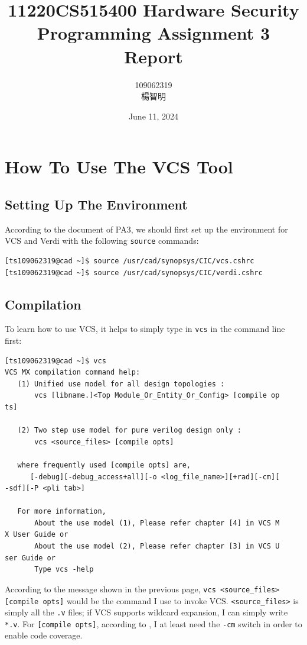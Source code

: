 \documentclass{article}
\title{11220CS515400 Hardware Security\\Programming Assignment 3 Report}
\author{109062319 \begin{CJK*}{UTF8}{bkai}楊智明\end{CJK*}}
\date{June 11, 2024}
\begin{document}
\maketitle

\section{How To Use The VCS Tool}

\subsection{Setting Up The Environment}

According to the document of PA3, we should first set up the environment for VCS and Verdi with the following \verb|source| commands:

\begin{verbatim}
[ts109062319@cad ~]$ source /usr/cad/synopsys/CIC/vcs.cshrc
[ts109062319@cad ~]$ source /usr/cad/synopsys/CIC/verdi.cshrc
\end{verbatim}

\subsection{Compilation}

To learn how to use VCS, it helps to simply type in \verb|vcs| in the command line first:

\begin{verbatim}
[ts109062319@cad ~]$ vcs
VCS MX compilation command help:
   (1) Unified use model for all design topologies :
       vcs [libname.]<Top Module_Or_Entity_Or_Config> [compile op
ts]

   (2) Two step use model for pure verilog design only :
       vcs <source_files> [compile opts]

   where frequently used [compile opts] are,
      [-debug][-debug_access+all][-o <log_file_name>][+rad][-cm][
-sdf][-P <pli tab>]

   For more information,
       About the use model (1), Please refer chapter [4] in VCS M
X User Guide or
       About the use model (2), Please refer chapter [3] in VCS U
ser Guide or
       Type vcs -help
\end{verbatim}

According to the message shown in the previous page, \verb|vcs <source_files>|\\\verb|[compile opts]| would be the command I use to invoke VCS. \verb|<source_files>| is simply all the \verb|.v| files; if VCS supports wildcard expansion, I can simply write \verb|*.v|. For \verb|[compile opts]|, according to \cite{csdnverdicov}, I at least need the \verb|-cm| switch in order to enable code coverage.
\end{document}
